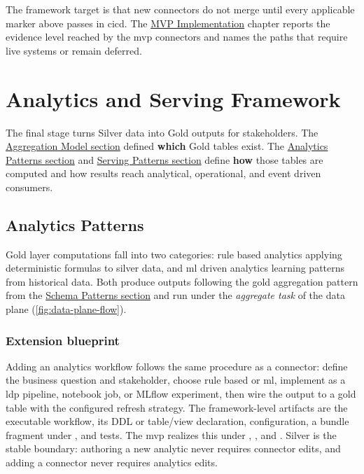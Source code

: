 The framework target is that new connectors do not merge until every applicable marker above passes in \gls{cicd}. The \hyperref[ch:implementation]{MVP Implementation} chapter reports the evidence level reached by the \gls{mvp} connectors and names the paths that require live systems or remain deferred.


\section{Analytics and Serving Framework}
\label{sec:analytics-serving}

The final stage turns Silver data into Gold outputs for stakeholders. The \hyperref[sec:aggregation-model]{Aggregation Model section} defined \textbf{which} Gold tables exist. The \hyperref[sec:analytics-patterns]{Analytics Patterns section} and \hyperref[sec:serving-patterns]{Serving Patterns section} define \textbf{how} those tables are computed and how results reach analytical, operational, and event driven consumers.


\subsection{Analytics Patterns}
\label{sec:analytics-patterns}

Gold layer computations fall into two categories: rule based analytics applying deterministic formulas to silver data, and \gls{ml} driven analytics learning patterns from historical data. Both produce outputs following the gold aggregation pattern from the \hyperref[sec:schema-patterns]{Schema Patterns section} and run under the \emph{aggregate task} of the data plane (\autoref{fig:data-plane-flow}).

\subsubsection{Extension blueprint}

Adding an analytics workflow follows the same procedure as a connector: define the business question and stakeholder, choose rule based or \gls{ml}, implement as a \gls{ldp} pipeline, notebook job, or MLflow experiment, then wire the output to a gold table with the configured refresh strategy. The framework-level artifacts are the executable workflow, its DDL or table/view declaration, configuration, a bundle fragment under , and tests. The \gls{mvp} realizes this under , , and . Silver is the stable boundary: authoring a new analytic never requires connector edits, and adding a connector never requires analytics edits.

